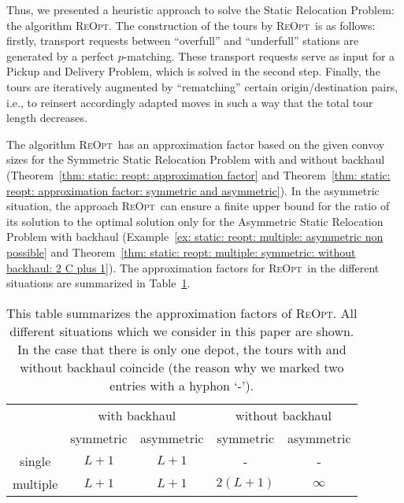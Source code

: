 \documentclass[english]{llncs}
\numberwithin{sublemma}{lemma}
\newcommand{\capd}{\ensuremath{L}}
\newcommand{\REOPT}{\textsc{ReOpt}\xspace}
\begin{document}
Thus, we presented a heuristic approach to solve the Static Relocation Problem: the algorithm \REOPT.
The construction of the tours by \REOPT\ is as follows:
firstly, transport requests between ``overfull'' and ``underfull'' stations are generated by a perfect $p$-matching.
These transport requests serve as input for a Pickup and Delivery Problem, which is solved in the second step.
Finally, the tours are iteratively augmented by ``rematching'' certain origin/destination pairs, i.e., to reinsert accordingly adapted moves in such a way 
that the total tour length decreases.



The algorithm \REOPT\ has an approximation factor based on the given convoy sizes for the Symmetric Static Relocation Problem with and without backhaul
(Theorem~\ref{thm: static: reopt: approximation factor} and Theorem~\ref{thm: static: reopt: approximation factor: symmetric and asymmetric}).
In the asymmetric situation, the approach \REOPT\ can ensure a finite upper bound for the ratio of its solution to the optimal solution
only for the Asymmetric Static Relocation Problem with backhaul (Example~\ref{ex: static: reopt: multiple: asymmetric non possible} and Theorem~\ref{thm: static: reopt: multiple: symmetric: without backhaul: 2 C plus 1}).
The approximation factors for \REOPT\ in the different situations are summarized in Table~\ref{tab: conclusion: summary: approximation factors}.

\begin{table}[!htbp]
\centering
\caption{This table summarizes the approximation factors of \REOPT.
    All different situations which we consider in this paper are shown.
    In the case that there is only one depot, the tours with and without backhaul coincide (the reason why we marked two entries with a hyphon `-').}
\label{tab: conclusion: summary: approximation factors}
\begin{tabular}{c|c|c|c|c}
&  \multicolumn{2}{c|}{with backhaul} & \multicolumn{2}{c}{without backhaul} \\ \cline{2-5}
          & symmetric   & asymmetric           & symmetric & asymmetric \\ \cline{2-5}
single    & $\capd + 1$ & $\capd + 1$          & - & - \\ \hline
multiple  & $\capd + 1$ & $\capd + 1$          & $2 (\capd + 1)$  & $\infty$ \\
\end{tabular}
\end{table}
\end{document}
